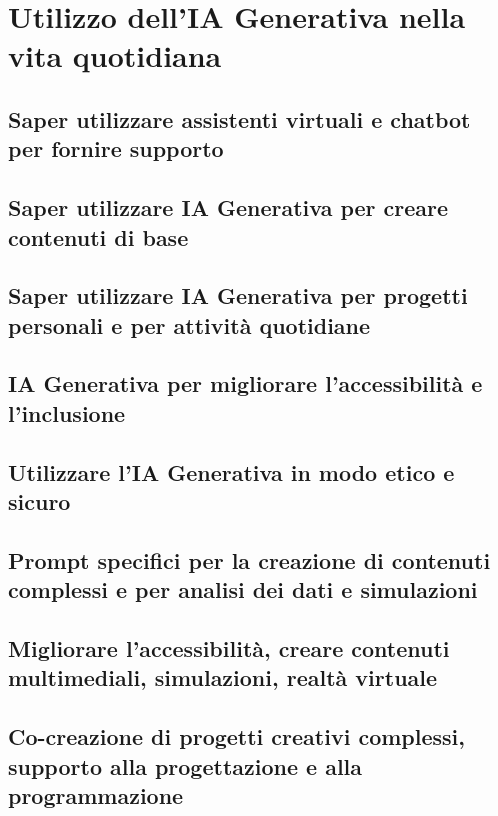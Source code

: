 \section{Utilizzo dell'IA Generativa nella vita quotidiana}
    
    \subsection{Saper utilizzare assistenti virtuali e chatbot per fornire supporto}
    
    \subsection{Saper utilizzare IA Generativa per creare contenuti di base}
    
    \subsection{Saper utilizzare IA Generativa per progetti personali e per attività quotidiane}
    
    \subsection{IA Generativa per migliorare l'accessibilità e l'inclusione}
    
    \subsection{Utilizzare l'IA Generativa in modo etico e sicuro}
    
    \subsection{Prompt specifici per la creazione di contenuti complessi e per analisi dei dati e simulazioni}
    
    \subsection{Migliorare l'accessibilità, creare contenuti multimediali, simulazioni, realtà virtuale}
    
    \subsection{Co-creazione di progetti creativi complessi, supporto alla progettazione e alla programmazione}
    
